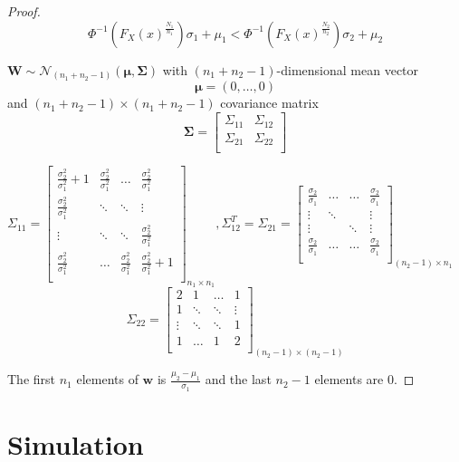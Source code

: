 \documentclass[12pt]{article}
\begin{document}
\begin{proof}
$$\Phi^{-1}(F_X(x)^{\frac{N_1}{n_1}})\sigma_1 + \mu_1 < \Phi^{-1}(F_X(x)^{\frac{N_2}{n_2}})\sigma_2 + \mu_2$$


$\mathbf{W} \sim \mathcal{N}_{(n_1 + n_2 - 1)}(\boldsymbol{\mu}, \boldsymbol{\Sigma})$ with $(n_1 + n_2 - 1)$-dimensional mean vector $$\boldsymbol{\mu} = (0, \dots, 0)$$ and $(n_1 + n_2 - 1) \times (n_1 + n_2 - 1)$ covariance matrix $$\boldsymbol{\Sigma} = \begin{bmatrix}
	\Sigma_{11} & \Sigma_{12}\\
	\Sigma_{21} & \Sigma_{22}\\
\end{bmatrix}$$

$\Sigma_{11} = \begin{bmatrix}
\frac{\sigma_2^2}{\sigma_1^2}+1 & \frac{\sigma_2^2}{\sigma_1^2} & \hdots & \frac{\sigma_2^2}{\sigma_1^2} \\
\frac{\sigma_2^2}{\sigma_1^2} & \ddots & \ddots  & \vdots \\
\vdots & \ddots & \ddots & \frac{\sigma_2^2}{\sigma_1^2} \\
\frac{\sigma_2^2}{\sigma_1^2} & \dots & \frac{\sigma_2^2}{\sigma_1^2} & \frac{\sigma_2^2}{\sigma_1^2}+1\\
\end{bmatrix}_{n_1 \times n_1}, 
\Sigma_{12}^{T} = \Sigma_{21} = \begin{bmatrix}
\frac{\sigma_2}{\sigma_1} & \hdots & \hdots & \frac{\sigma_2}{\sigma_1}\\
\vdots & \ddots &  & \vdots\\
\vdots &  & \ddots & \vdots\\
\frac{\sigma_2}{\sigma_1} & \hdots &\hdots & \frac{\sigma_2}{\sigma_1}\\
\end{bmatrix}_{(n_2-1) \times n_1}$
$$
\Sigma_{22} = \begin{bmatrix}
2 & 1 & \hdots & 1\\
1 & \ddots & \ddots & \vdots\\
\vdots & \ddots & \ddots & 1\\
1 & \hdots & 1 & 2\\
\end{bmatrix}_{(n_2-1) \times (n_2-1)}$$

The first $n_1$ elements of $\mathbf{w}$ is $\frac{\mu_2 - \mu_1}{\sigma_1}$ and the last $n_2-1$ elements are 0. 

\end{proof}

\section{Simulation}
\end{document}
